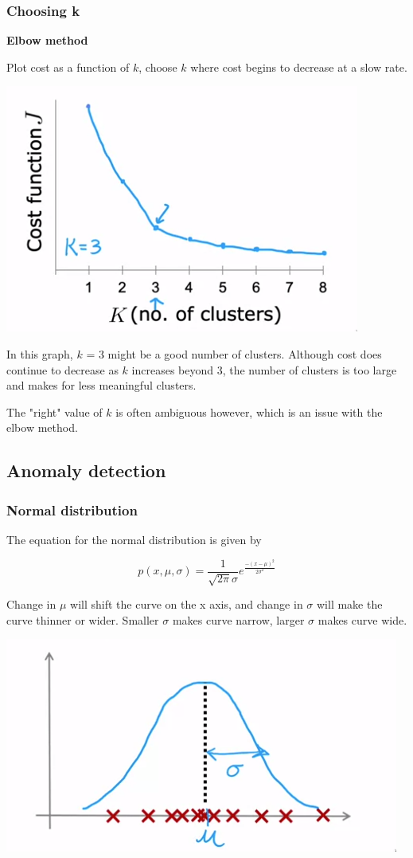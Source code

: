 \documentclass[12pt]{article}
\begin{document}
\subsubsection{Choosing k}

\textbf{Elbow method}

Plot cost as a function of $k$, choose $k$ where cost begins to decrease at a slow rate.

\includegraphics[scale=.6]{elbow}

In this graph, $k$ = 3 might be a good number of clusters. Although cost does continue to decrease as $k$ increases
beyond 3, the number of clusters is too large and makes for less meaningful clusters.

The "right" value of $k$ is often ambiguous however, which is an issue with the elbow method.

\subsection{Anomaly detection}

\subsubsection{Normal distribution}

The equation for the normal distribution is given by

\[ p(x,\mu,\sigma) = \frac{1}{\sqrt{2\pi}\sigma} e^{\frac{-(x - \mu)^2}{2\sigma^2}} \]

Change in $\mu$ will shift the curve on the x axis, and change in $\sigma$ will make the curve
thinner or wider. Smaller $\sigma$ makes curve narrow, larger $\sigma$ makes curve wide.

\includegraphics{images/normal-distribution.png}
\end{document}
